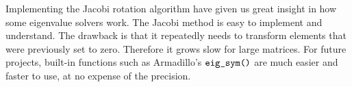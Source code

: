 Implementing the Jacobi rotation algorithm have given us great insight in how some
eigenvalue solvers work. The Jacobi method is easy to implement and understand. The
drawback is that it repeatedly needs to transform elements that were previously set to
zero. Therefore it grows slow for large matrices. For future projects, built-in functions
such as Armadillo's $\verb|eig_sym()|$ are much easier and faster to use, at no expense of
the precision.
